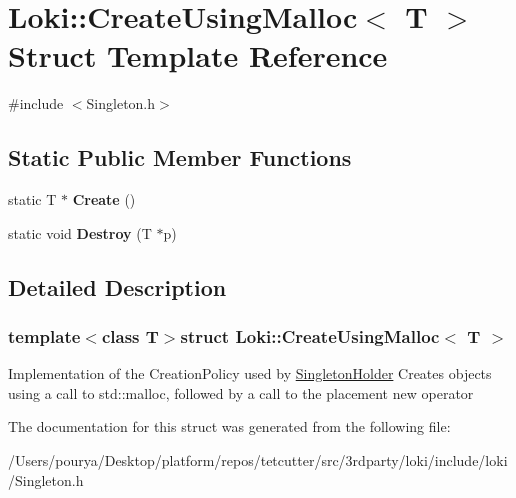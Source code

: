 \hypertarget{structLoki_1_1CreateUsingMalloc}{}\section{Loki\+:\+:Create\+Using\+Malloc$<$ T $>$ Struct Template Reference}
\label{structLoki_1_1CreateUsingMalloc}


{\ttfamily \#include $<$Singleton.\+h$>$}

\subsection*{Static Public Member Functions}
\begin{DoxyCompactItemize}
\item 
\hypertarget{structLoki_1_1CreateUsingMalloc_a55bf1f773f835e3b56bf7f51e17f03f6}{}static T $\ast$ {\bfseries Create} ()\label{structLoki_1_1CreateUsingMalloc_a55bf1f773f835e3b56bf7f51e17f03f6}

\item 
\hypertarget{structLoki_1_1CreateUsingMalloc_affb9968bbfb43c4199a538f95bc2d2fc}{}static void {\bfseries Destroy} (T $\ast$p)\label{structLoki_1_1CreateUsingMalloc_affb9968bbfb43c4199a538f95bc2d2fc}

\end{DoxyCompactItemize}


\subsection{Detailed Description}
\subsubsection*{template$<$class T$>$struct Loki\+::\+Create\+Using\+Malloc$<$ T $>$}

Implementation of the Creation\+Policy used by \hyperlink{classLoki_1_1SingletonHolder}{Singleton\+Holder} Creates objects using a call to std\+::malloc, followed by a call to the placement new operator 

The documentation for this struct was generated from the following file\+:\begin{DoxyCompactItemize}
\item 
/\+Users/pourya/\+Desktop/platform/repos/tetcutter/src/3rdparty/loki/include/loki/Singleton.\+h\end{DoxyCompactItemize}
